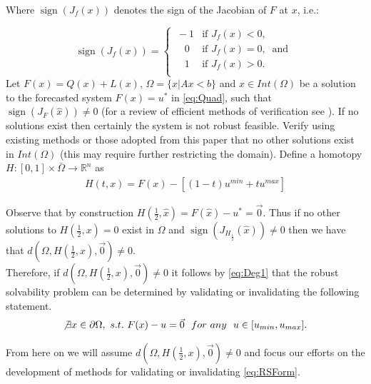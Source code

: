 \documentclass[11pt]{article}
\theoremstyle{plain}
\theoremstyle{definition}
\theoremstyle{remark}
\begin{document}
Where $\operatorname{sign}\left(J_f(x)\right)$ denotes the sign of the Jacobian of $F$ at $x$, i.e.:

\[\operatorname{sign}\left(J_f(x)\right)=   \left\{
\begin{array}{ll}
       \ -1   & \mbox{if } J_f(x)< 0, \\
      \quad 0 & \mbox{if } J_f(x)= 0,~\mbox{ and } \\
      \quad 1 & \mbox{if } J_f(x)> 0. \\
\end{array} 
\right. \]
Let $F(x)=Q(x)+L(x)$, $\Omega=\{x| Ax< b\}$ and $\hat{x}\in Int(\Omega)$ be a solution to the forecasted system $F(x)=u^*$ in \cref{eq:Quad}, such that $\operatorname{sign}\left(J_{F}(\hat{x})\right)\neq 0$ (for a review of efficient methods of verification see \cite{GRIEWANK2014}). 
If no solutions exist then certainly the system is not robust feasible. 
Verify using existing methods or those adopted from this paper that no other solutions exist in $Int(\Omega)$ (this may require further restricting the domain). Define a homotopy $H : [0,1]\times\bar{\Omega}\rightarrow\mathbb{R}^n$ as 
\begin{align}
H(t,x) = F(x)-\left[(1-t)u^{min}+tu^{max}\right] \label{eq:Homo}
\end{align}

Observe that by construction $H\left(\frac{1}{2},\hat{x}\right)=F(\hat{x})-u^*=\vec{0}$. Thus if no other solutions to $H\left(\frac{1}{2},x\right)=0$ exist in $\Omega$ and $\operatorname{sign}\left(J_{H_{\frac{1}{2}}}(\hat{x})\right)\neq 0$ then we have that $d(\Omega,H\left(\frac{1}{2},x\right),\vec{0})\neq 0$. \\
Therefore, if $d(\Omega,H\left(\frac{1}{2},x\right),\vec{0})\neq 0$ it follows by \cref{eq:Deg1} that the robust solvability problem can be determined by validating or invalidating the following statement.
\begin{align}
\not\exists x\in\partial\Omega, \ s.t. \ F(x)-u=\vec{0}	 \ \ for \ any \ \ u\in[u_{min},u_{max}]. \label{eq:RSForm}
\end{align}

From here on we will assume $d(\Omega,H\left(\frac{1}{2},x\right),\vec{0})\neq 0$ and focus our efforts on the development of methods for validating or invalidating \cref{eq:RSForm}.\\
\end{document}
